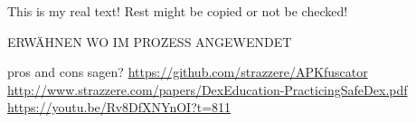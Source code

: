 This is my real text! Rest might be copied or not be checked!

ERWÄHNEN WO IM PROZESS ANGEWENDET\newline

pros and cons sagen?\newline
\url{https://github.com/strazzere/APKfuscator}\newline
\url{http://www.strazzere.com/papers/DexEducation-PracticingSafeDex.pdf}\newline
\url{https://youtu.be/Rv8DfXNYnOI?t=811}
